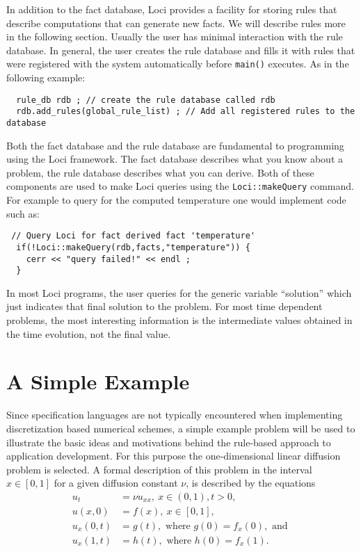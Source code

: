 \documentclass[10pt,epsf]{book}
\begin{document}
In addition to the fact database, Loci provides a facility for storing
rules that describe computations that can generate new facts.  We will
describe rules more in the following section.  Usually the user has
minimal interaction with the rule database.  In general, the user
creates the rule database and fills it with rules that were registered
with the system automatically before {\tt main()} executes.  As in the
following example:
\begin{verbatim}
  rule_db rdb ; // create the rule database called rdb
  rdb.add_rules(global_rule_list) ; // Add all registered rules to the database
\end{verbatim}
Both the fact database and the rule database are fundamental to
programming using the Loci framework.  The fact database describes
what you know about a problem, the rule database describes what you
can derive.  Both of these components are used to make Loci queries
using the {\tt Loci::makeQuery} command.  For example to query for the
computed temperature one would implement code such as:
\begin{verbatim}
 // Query Loci for fact derived fact 'temperature'
  if(!Loci::makeQuery(rdb,facts,"temperature")) {
    cerr << "query failed!" << endl ;
  }
\end{verbatim}
In most Loci programs, the user queries for the generic variable
``solution'' which just indicates that final solution to the problem.
For most time dependent problems, the most interesting information is
the intermediate values obtained in the time evolution, not the final
value.

\section{A Simple Example}

Since specification languages are not typically encountered when
implementing discretization based numerical schemes, a simple example
problem will be used to illustrate the basic ideas and motivations
behind the rule-based approach to application development.  For this
purpose the one-dimensional linear diffusion problem is selected.  A formal
description of this problem in the interval  $x\in[0,1]$ for a given
diffusion constant $\nu$, is described by the equations
\begin{align}
\label{eq3:diffuse}
u_t      & =  \nu u_{xx},~ x \in (0,1), t>0,\\
\label{eq3:diffuseinitial}
u(x,0)   & =  f(x),~ x \in [0,1],\\
\label{eq3:diffuseb0}
u_x(0,t) & =  g(t), \mbox{ where } g(0) = f_x(0), \mbox{ and }\\
\label{eq3:diffuseb1}
u_x(1,t) & =  h(t), \mbox{ where } h(0) = f_x(1).
\end{align}
\end{document}
